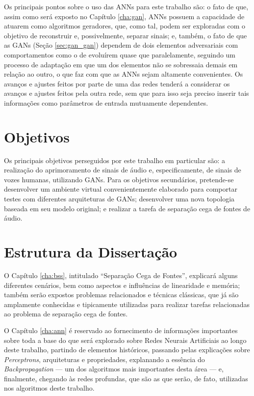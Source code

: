 Os principais pontos sobre o uso das ANNs para este trabalho são: o fato de que, assim como será exposto no Capítulo \ref{cha:gan}, ANNs possuem a capacidade de atuarem como algoritmos geradores, que, como tal, podem ser exploradas com o objetivo de reconstruir e, possivelmente, separar sinais; e, também, o fato de que as GANs (Seção \ref{sec:gan_gan}) dependem de dois elementos adversariais com comportamentos como o de evoluírem quase que paralelamente, seguindo um processo de adaptação em que um dos elementos não se sobressaia demais em relação ao outro, o que faz com que as ANNs sejam altamente convenientes. Os avanços e ajustes feitos por parte de uma das redes tenderá a considerar os avanços e ajustes feitos pela outra rede, sem que para isso seja preciso inserir tais informações como parâmetros de entrada mutuamente dependentes.


\section{Objetivos}
\label{sec:intro_objectives}

Os principais objetivos perseguidos por este trabalho em particular são: a realização do aprimoramento de sinais de áudio e, especificamente, de sinais de vozes humanas, utilizando GANs. Para os objetivos secundários, pretende-se desenvolver um ambiente virtual convenientemente elaborado para comportar testes com diferentes arquiteturas de GANs; desenvolver uma nova topologia baseada em seu modelo original; e realizar a tarefa de separação cega de fontes de áudio.


\section{Estrutura da Dissertação}
\label{sec:intro_dissertation_structure}

O Capítulo \ref{cha:bss}, intitulado ``Separação Cega de Fontes'', explicará alguns diferentes cenários, bem como aspectos e influências de linearidade e memória; também  serão expostos problemas relacionados e técnicas clássicas, que já são amplamente conhecidas e tipicamente utilizadas para realizar tarefas relacionadas ao problema de separação cega de fontes.

O Capítulo \ref{cha:ann} é reservado ao fornecimento de informações importantes sobre toda a base do que será explorado sobre Redes Neurais Artificiais ao longo deste trabalho, partindo de elementos históricos, passando pelas explicações sobre \textit{Perceptrons}, arquiteturas e propriedades, explanando a essência do \textit{Backpropagation} --- um dos algoritmos mais importantes desta área --- e, finalmente, chegando às redes profundas, que são as que serão, de fato, utilizadas nos algoritmos deste trabalho.

